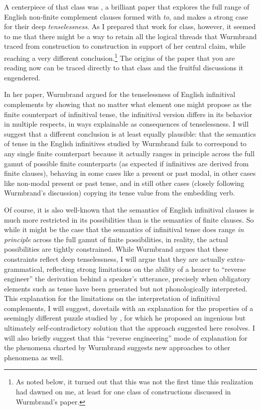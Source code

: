 \documentclass[output=paper]{langscibook}
\begin{document}
A centerpiece of that class was \citet{Wurmbrand:2014aa}, a brilliant paper that explores the full range of English non-finite complement clauses formed with \textit{to}, and makes a strong case for their deep \textit{tenselessness}. As I prepared that work for class, however, it seemed to me that there might be a way to retain all the logical threads that Wurmbrand traced from construction to construction in support of her central claim, while reaching a very different conclusion.\footnote{As noted below, it turned out that this was not the first time this realization had dawned on me, at least for one class of constructions discussed in Wurmbrand's paper.} The origins of the paper that you are reading now can be traced directly to that class and the fruitful discussions it engendered.

In her paper, Wurmbrand argued for the tenselessness of English infinitival complements by showing that no matter what element one might propose as the finite counterpart of infinitival tense, the infinitival version differs in its behavior in multiple respects, in ways explainable as consequences of tenselessness. I will suggest that a different conclusion is at least equally plausible: that the semantics of tense in the English infinitives studied by Wurmbrand fails to correspond to any single finite counterpart because it actually ranges in principle across the full gamut of possible finite counterparts (as expected if infinitives are derived from finite clauses), behaving in some cases like a present or past modal, in other cases like non-modal present or past tense, and in still other cases (closely following Wurmbrand's discussion) copying its tense value from the embedding verb.\thispagestyle{empty} 

Of course, it is also well-known that the semantics of English infinitival clauses is much more restricted in its possibilities than is the semantics of finite clauses. So while it might be the case that the semantics of infinitival tense does range \textit{in principle} across the full gamut of finite possibilities, in reality, the actual possibilities are tightly constrained. While Wurmbrand argues that these constraints reflect deep tenselessness, I will argue that they are actually extra-grammatical, reflecting strong limitations on the ability of a hearer to “reverse engineer” the derivation behind a speaker's utterance, precisely when obligatory elements such as tense have been generated but not phonologically interpreted. This explanation for the limitations on the interpretation of infinitival complements, I will suggest, dovetails with an explanation for the properties of a seemingly different puzzle studied by \citet{fitzpatrick2006deletion}, for which he proposed an ingenious but ultimately self-contradictory solution that the approach suggested here resolves. I will also briefly suggest that this “reverse engineering” mode of explanation for the phenomena charted by Wurmbrand suggests new approaches to other phenomena as well.
\end{document}

